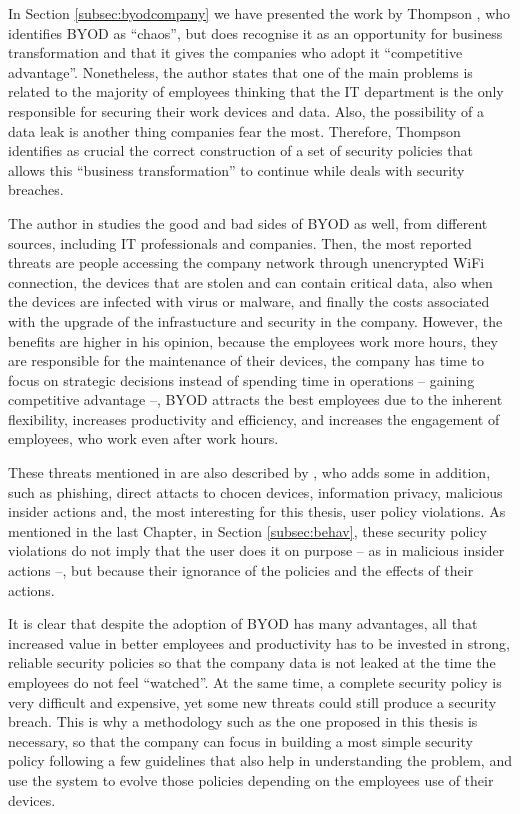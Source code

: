 In Section \ref{subsec:byodcompany} we have presented the work by Thompson \cite{thomson2012byod}, who identifies BYOD as ``chaos'', but does recognise it as an opportunity for business transformation and that it gives the companies who adopt it ``competitive advantage''. Nonetheless, the author states that one of the main problems is related to the majority of employees thinking that the IT department is the only responsible for securing their work devices and data. Also, the possibility of a data leak is another thing companies fear the most. Therefore, Thompson identifies as crucial the correct construction of a set of security policies that allows this ``business transformation'' to continue while deals with security breaches.

The author in \cite{singh2012byod} studies the good and bad sides of BYOD as well, from different sources, including IT professionals and companies. Then, the most reported threats are people accessing the company network through unencrypted WiFi connection, the devices that are stolen and can contain critical data, also when the devices are infected with virus or malware, and finally the costs associated with the upgrade of the infrastucture and security in the company. However, the benefits are higher in his opinion, because the employees work more hours, they are responsible for the maintenance of their devices, the company has time to focus on strategic decisions instead of spending time in operations -- gaining competitive advantage --, BYOD attracts the best employees due to the inherent flexibility, increases productivity and efficiency, and increases the engagement of employees, who work even after work hours.

These threats mentioned in \cite{singh2012byod} are also described by \cite{Garba15organisational}, who adds some in addition, such as phishing, direct attacts to chocen devices, information privacy, malicious insider actions and, the most interesting for this thesis, user policy violations. As mentioned in the last Chapter, in Section \ref{subsec:behav}, these security policy violations do not imply that the user does it on purpose -- as in malicious insider actions --, but because their ignorance of the policies and the effects of their actions.

It is clear that despite the adoption of BYOD has many advantages, all that increased value in better employees and productivity has to be invested in strong, reliable security policies so that the company data is not leaked at the time the employees do not feel ``watched''. At the same time, a complete security policy is very difficult and expensive, yet some new threats could still produce a security breach. This is why a methodology such as the one proposed in this thesis is necessary, so that the company can focus in building a most simple security policy following a few guidelines that also help in understanding the problem, and use the system to evolve those policies depending on the employees use of their devices.

